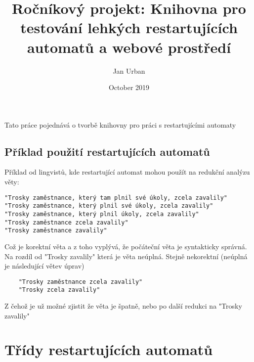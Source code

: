 \documentclass{article}
\title{ Ročníkový projekt: Knihovna pro testování lehkých restartujících automatů a webové prostředí}
\author{Jan Urban }
\date{October 2019}
\begin{document}
\maketitle

Tato práce pojednává o tvorbě knihovny pro práci s restartujícími automaty 
\subsection{Příklad použití restartujících automatů}
Příklad od lingvistů, kde restartující automat mohou použít na redukční analýzu věty:

\begin{verbatim}
"Trosky zaměstnance, který tam plnil své úkoly, zcela zavalily"
"Trosky zaměstnance, který plnil své úkoly, zcela zavalily"
"Trosky zaměstnance, který plnil úkoly, zcela zavalily"
"Trosky zaměstnance zcela zavalily"
"Trosky zaměstnance zavalily"
\end{verbatim}

Což je korektní věta a z toho vyplývá, že počáteční věta je syntakticky správná. Na rozdíl od "Trosky zavalily" která je věta neúplná. Stejně nekorektní (neúplná je následující větev úprav)

\begin{verbatim}
	"Trosky zaměstnance zcela zavalily"
	"Trosky zcela zavalily"
\end{verbatim}

Z čehož je už možné zjistit že věta je špatně, nebo po další redukci na "Trosky zavalily"

\section{Třídy restartujících automatů}
\end{document}
